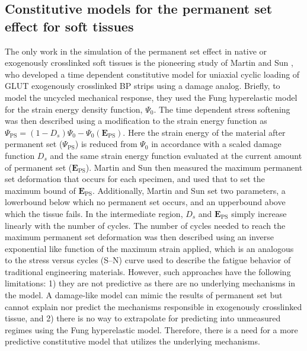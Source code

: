 		

\subsection{Constitutive models for the permanent set effect for soft tissues}

	The only work in the simulation of the permanent set effect in native or exogenously crosslinked soft tissues is the pioneering study of Martin and Sun \cite{martin_modeling_2012}, who developed a time dependent constitutive model for uniaxial cyclic loading of GLUT exogenously crosslinked BP strips using a damage analog. Briefly, to model the uncycled mechanical response, they used the Fung hyperelastic model for the strain energy density function, $\Psi_0$. The time dependent stress softening was then described using a modification to the strain energy function as $\Psi_\mathrm{PS} = (1-D_s)\Psi_0 - \Psi_0(\mathbf{E}_\mathrm{PS})$. Here the strain energy of the material after permanent set ($\Psi_\mathrm{PS}$) is reduced from $\Psi_0$ in accordance with a scaled damage function $D_s$ and the same strain energy function evaluated at the current amount of permanent set ($\mathbf{E}_\mathrm{PS}$). Martin and Sun then measured the maximum permanent set deformation that occurs for each specimen, and used that to set the maximum bound of $\mathbf{E}_\mathrm{PS}$. Additionally, Martin and Sun set two parameters, a lowerbound below which no permanent set occurs, and an upperbound above which the tissue fails. In the intermediate region, $D_s$ and $\mathbf{E}_\mathrm{PS}$ simply increase linearly with the number of cycles. The number of cycles needed to reach the maximum permanent set deformation was then described using an inverse exponential like function of the maximum strain applied, which is an analogous to the stress versus cycles (S–N) curve used to describe the fatigue behavior of traditional engineering materials. However, such approaches have the following limitations: 1) they are not predictive as there are no underlying mechanisms in the model. A damage-like model can mimic the results of permanent set but cannot explain nor predict the mechanisms responsible in exogenously crosslinked tissue, and 2) there is no way to extrapolate for predicting into unmeasured regimes using the Fung hyperelastic model. Therefore, there is a need for a more predictive constitutive model that utilizes the underlying mechanisms.


